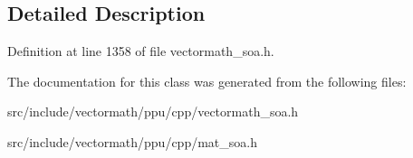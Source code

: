 \subsection{Detailed Description}


Definition at line 1358 of file vectormath\-\_\-soa.\-h.



The documentation for this class was generated from the following files\-:\begin{DoxyCompactItemize}
\item 
src/include/vectormath/ppu/cpp/vectormath\-\_\-soa.\-h\item 
src/include/vectormath/ppu/cpp/mat\-\_\-soa.\-h\end{DoxyCompactItemize}
